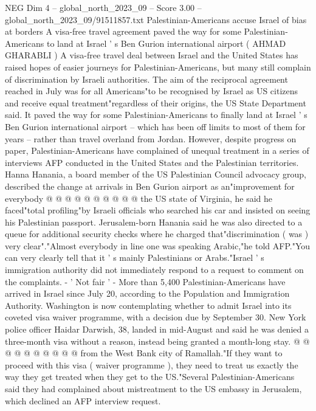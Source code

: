 \begin{textsample}{NEG Dim 4 – global\_north\_2023\_09 – Score 3.00 – global\_north\_2023\_09/91511857.txt}  \label{ex:f4_neg_049}
Palestinian-Americans accuse Israel of bias at borders A visa-free travel agreement paved the way for some Palestinian-Americans to land at Israel ' s Ben Gurion international airport ( AHMAD GHARABLI ) A visa-free travel deal between Israel and the United States has raised hopes of easier journeys for Palestinian-Americans, but many still complain of discrimination by Israeli authorities.
The aim of the reciprocal agreement reached in July was for all Americans"to be recognised by Israel as US citizens and receive equal treatment"regardless of their origins, the US State Department said.
It paved the way for some Palestinian-Americans to finally land at Israel ' s Ben Gurion international airport -- which has been off limits to most of them for years -- rather than travel overland from Jordan.
However, despite progress on paper, Palestinian-Americans have complained of unequal treatment in a series of interviews AFP conducted in the United States and the Palestinian territories.
Hanna Hanania, a board member of the US Palestinian Council advocacy group, described the change at arrivals in Ben Gurion airport as an"improvement for everybody @ @ @ @ @ @ @ @ @ @ the US state of Virginia, he said he faced"total profiling"by Israeli officials who searched his car and insisted on seeing his Palestinian passport.
Jerusalem-born Hanania said he was also directed to a queue for additional security checks where he charged that"discrimination ( was ) very clear"."Almost everybody in line one was speaking Arabic,"he told AFP."You can very clearly tell that it ' s mainly Palestinians or Arabs."Israel ' s immigration authority did not immediately respond to a request to comment on the complaints. - ' Not fair ' - More than 5,400 Palestinian-Americans have arrived in Israel since July 20, according to the Population and Immigration Authority.
Washington is now contemplating whether to admit Israel into its coveted visa waiver programme, with a decision due by September 30.
New York police officer Haidar Darwish, 38, landed in mid-August and said he was denied a three-month visa without a reason, instead being granted a month-long stay. @ @ @ @ @ @ @ @ @ @ from the West Bank city of Ramallah."If they want to proceed with this visa ( waiver programme ), they need to treat us exactly the way they get treated when they get to the US."Several Palestinian-Americans said they had complained about mistreatment to the US embassy in Jerusalem, which declined an AFP interview request.

\end{textsample}
